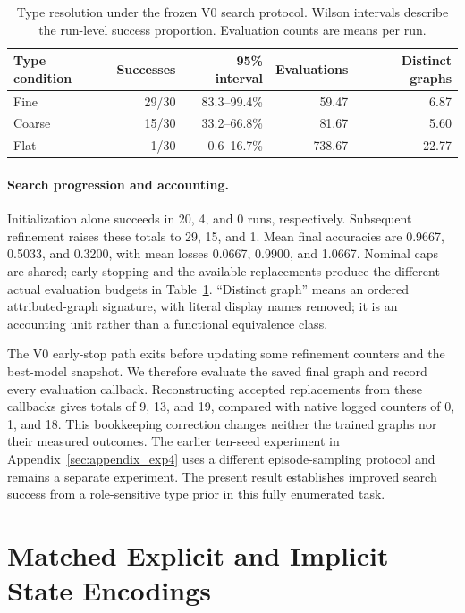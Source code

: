 \begin{table}[tb]
\centering
\small
\caption{Type resolution under the frozen V0 search protocol. Wilson intervals
describe the run-level success proportion. Evaluation counts are means per run.}
\label{tab:revision_types_full}
\begin{tabular}{lrrrr}
\toprule
Type condition & Successes & 95\% interval & Evaluations & Distinct graphs \\
\midrule
Fine & 29/30 & 83.3--99.4\% & 59.47 & 6.87 \\
Coarse & 15/30 & 33.2--66.8\% & 81.67 & 5.60 \\
Flat & 1/30 & 0.6--16.7\% & 738.67 & 22.77 \\
\bottomrule
\end{tabular}
\end{table}

\paragraph{Search progression and accounting.}
Initialization alone succeeds in 20, 4, and 0 runs, respectively. Subsequent
refinement raises these totals to 29, 15, and 1. Mean final accuracies are
0.9667, 0.5033, and 0.3200, with mean losses 0.0667, 0.9900, and 1.0667.
Nominal caps are shared; early stopping and the available replacements produce
the different actual evaluation budgets in Table~\ref{tab:revision_types_full}.
``Distinct graph'' means an ordered attributed-graph signature, with literal
display names removed; it is an accounting unit rather than a functional
equivalence class.

The V0 early-stop path exits before updating some refinement counters and the
best-model snapshot. We therefore evaluate the saved final graph and record
every evaluation callback. Reconstructing accepted replacements from these
callbacks gives totals of 9, 13, and 19, compared with native logged counters
of 0, 1, and 18. This bookkeeping correction changes neither the trained graphs
nor their measured outcomes. The earlier ten-seed experiment in
Appendix~\ref{sec:appendix_exp4} uses a different episode-sampling protocol and
remains a separate experiment. The present result establishes improved search
success from a role-sensitive type prior in this fully enumerated task.

\section{Matched Explicit and Implicit State Encodings}
\label{app:revision_encoding}

